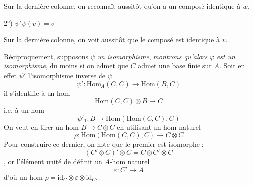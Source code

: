 \documentclass[11pt,a4paper]{article}
\begin{document}
Sur la dernière colonne, on reconnaît aussitôt qu'on a un composé
identique à $w$.

2°) $\psi' \psi(v) = v$



Sur la dernière colonne, on voit aussitôt que le composé est identique à
$v$.


Réciproquement, supposons $\psi$ \emph{un isomorphisme}, \emph{montrons
qu'alors} $\varphi$ \emph{est un isomorphisme}, du moins si on admet que
$C$ admet une base finie sur $A$. Soit en effet $\psi'$ l'isomorphisme
inverse de $\psi$
\[
\psi' : \mathrm{Hom}_A(C, C) \longrightarrow \mathrm{Hom}(B, C)
\]
il s'identifie à un hom
\struck{\ill{}}
\[
\mathrm{Hom}(C, C) \otimes B \longrightarrow C
\]
i.e. à un hom
\[
\psi'_1 : B \longrightarrow \mathrm{Hom}(\mathrm{Hom}(C, C), C)
\]
On veut en tirer un hom $B \to C \otimes C$ en utilisant un hom naturel
\[
\rho : \mathrm{Hom}(\mathrm{Hom}(C, C), C) \longrightarrow C \otimes C
\]
Pour construire ce dernier, on note que le premier est isomorphe :
\[
(C' \otimes C)' \otimes C = C \otimes C' \otimes C
\]
\struck{[En}    \struck{\ill{}}  \struck{${}\to{}$}         \struck{${}\mapsto (v \circ u)(p)$]}, or l'élément unité de
 définit un $A$-hom naturel
\[
\varepsilon : C' \longrightarrow A
\]
d'où un hom $\rho = \mathrm{id}_C \otimes \varepsilon \otimes \mathrm{id}_C$.
\end{document}
